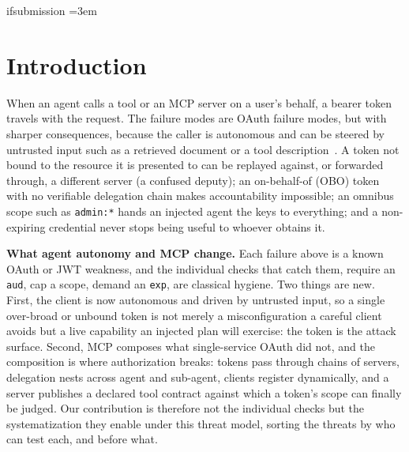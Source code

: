 \ifdefined\ifsubmission\else\expandafter\newif\csname ifsubmission\endcsname\submissiontrue\fi
\providecommand{\gate}[1]{\ifsubmission #1\else \textbf{[PENDING: #1]}\fi}
\providecommand{\draftonly}[1]{\ifsubmission\else \textbf{[NOTE: #1]}\fi}
\providecommand{\yes}{\ensuremath{\surd}}
\providecommand{\no}{\ensuremath{\times}}
\emergencystretch=3em

\ifdefined\keywayabstractdone\else\fi

\section{Introduction}
When an agent calls a tool or an MCP server on a user's behalf, a bearer token
travels with the request. The failure modes are OAuth failure modes, but with
sharper consequences, because the caller is autonomous and can be steered by
untrusted input such as a retrieved document or a tool description~\cite{agentauth2023indirectpi}.
A token not bound to the resource it is presented to can be replayed against, or
forwarded through, a different server (a confused deputy); an on-behalf-of (OBO)
token with no verifiable delegation chain makes accountability impossible; an
omnibus scope such as \texttt{admin:*} hands an injected agent the keys to
everything; and a non-expiring credential never stops being useful to whoever
obtains it.

\noindent\textbf{What agent autonomy and MCP change.} Each failure above is a known
OAuth or JWT weakness, and the individual checks that catch them, require an
\texttt{aud}, cap a scope, demand an \texttt{exp}, are classical hygiene. Two things
are new. First, the client is now autonomous and driven by untrusted input, so a
single over-broad or unbound token is not merely a misconfiguration a careful client
avoids but a live capability an injected plan will exercise: the token is the attack
surface. Second, MCP composes what single-service OAuth did not, and the composition
is where authorization breaks: tokens pass through chains of servers, delegation nests
across agent and sub-agent, clients register dynamically, and a server publishes a
declared tool contract against which a token's scope can finally be judged. Our
contribution is therefore not the individual checks but the systematization they
enable under this threat model, sorting the threats by who can test each, and before
what.

